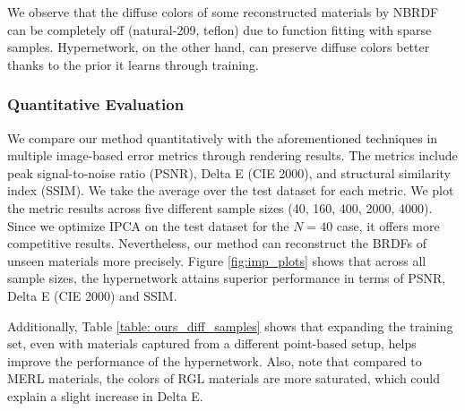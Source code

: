 We observe that the diffuse colors of some reconstructed materials by NBRDF can be completely off (natural-209, teflon) due to function fitting with sparse samples. Hypernetwork, on the other hand, can preserve diffuse colors better thanks to the prior it learns through training.


\subsubsection{Quantitative Evaluation}

We compare our method quantitatively with the aforementioned techniques in multiple image-based error metrics through rendering results. The metrics include peak signal-to-noise ratio (PSNR), Delta E (CIE 2000), and structural similarity index (SSIM). We take the average over the test dataset for each metric. We plot the metric results across five different sample sizes (40, 160, 400, 2000, 4000). Since we optimize IPCA on the test dataset for the $N = 40$ case, it offers more competitive results. Nevertheless, our method can reconstruct the BRDFs of unseen materials more precisely. Figure \ref{fig:imp_plots} shows that across all sample sizes, the hypernetwork attains superior performance in terms of PSNR, Delta E (CIE 2000) and SSIM. 

Additionally, Table \ref{table: ours_diff_samples} shows that expanding the training set, even with materials captured from a different point-based setup, helps improve the performance of the hypernetwork. Also, note that compared to MERL materials, the colors of RGL materials are more saturated, which could explain a slight increase in Delta E.


